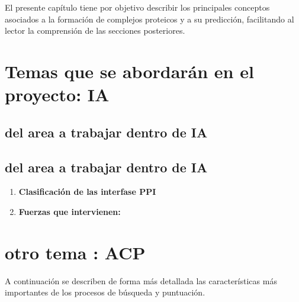 
El presente capítulo tiene por objetivo describir los principales conceptos asociados a la formación de complejos proteicos y a su predicción, facilitando al lector la comprensión de las secciones posteriores.

\section{Temas que se abordarán en el proyecto: IA}

\subsection{del area a trabajar dentro de IA}
\subsection{del area a trabajar dentro de IA}
\begin{enumerate}
  \item \textbf{Clasificación de las interfase PPI}
  \item \textbf{Fuerzas que intervienen:} 
\end{enumerate}


\section{otro tema : ACP}\label{sec:docking_proteina_proteina}


A continuación se describen de forma más detallada las características más importantes de los procesos de búsqueda y puntuación.



